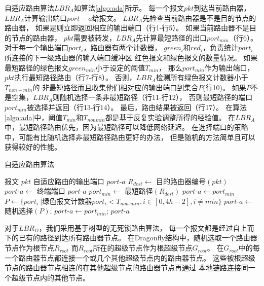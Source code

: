 自适应路由算法$LBR_A$如算法\ref{algo:ada}所示。
每一个报文$pkt$到达当前路由器，$LBR_A$计算输出端口$port-a$给报文。
$LBR_A$先检查当前路由器是不是目的节点的路由器，
如果是则立即返回相应的输出端口（行1-行5）。
如果当前路由器不是目的节点的路由器，
$pkt$需要被转发，$LBR_A$先计算最短路径的出口$port_{min}$（行6）。
对于每一个输出端口$port_i$，路由器有两个计数器，
$green_i$和$red_i$，负责统计$port_i$所连接的下一级路由器的输入端口缓冲区
红色报文和绿色报文的数量情况。
如果最短路径的绿色报文$green_{min}$小于设定的阈值$T_{min}$，
那么$port_{min}$作为输出端口，$pkt$执行最短路径路由（行7-行8）。
否则，$LBR_A$检测所有绿色报文计数器小于$T_{non-min}$的
非最短路径而且收集他们相对应的输出端口到集合$P$(行10)。
如果$P$不是空集，$LBR_A$则随机选择一条非最短路径（行11-行12），
否则最短路径的端口$port_{min}$被选择并返回（行13-行14）。
最后，路由结果被返回（行17）。
在算法\ref{algo:ada}中，阈值$T_{min}$和$T_{nonmin}$都是基于反复实验调整所得的经验值。
在$LBR_A$中，最短路径路由优先，因为最短路径可以降低网络延迟。
在选择端口的策略中，可能有比随机选择非最短路径路由更好的办法，
但是随机的方法简单且可以获得较好的性能。

\begin{algorithm}[t]
  \centering
  \caption{自适应路由算法}
  \label{algo:ada}
  \begin{algorithmic}[1]
    \REQUIRE 报文 $pkt$
    \ENSURE 自适应路由的输出端口 $port\textrm{-}a$
    \STATE $R_{dest} \leftarrow$ 目的路由器编号$(pkt)$
    \STATE $port\textrm{-}a \leftarrow$ 终端端口
    \RETURN $port\textrm{-}a$
    \ENDIF
    \STATE $port_{min} \leftarrow$ 最短路径$(R_{dest})$
    \STATE $port\textrm{-}a \leftarrow port_{min}$
    \ELSE
    \STATE $P \leftarrow \{port_i\ |$绿色报文计数器${port_i} < T_{non\textrm{-}min}, i \in [0,4h-2], i \neq min\}$\hspace{-1em}
    \STATE $port\textrm{-}a \leftarrow$ 随机选择$(P)$;
    \ELSE
    \STATE $port\textrm{-}a \leftarrow port_{min}$;
    \ENDIF
    \ENDIF
    \RETURN $port\textrm{-}a$
  \end{algorithmic}
\end{algorithm}

对于$LBR_D$，我们采用基于树型的无死锁路由算法，
每一个报文都是经过自上而下的已有的路径到达所有路由器节点。
在Dragonfly结构中，随机选取一个路由器节点作为根节点$R_{root}$
而$R_{root}$所在的超级节点作为根超级节点$G_{root}$。
在$G_{root}$中的每一个路由器节点都连接一个或几个其他超级节点内的路由器节点。
这些被根超级节点的路由器节点相连的在其他超级节点的路由器节点再通过
本地链路连接同一个超级节点内的其他节点。

